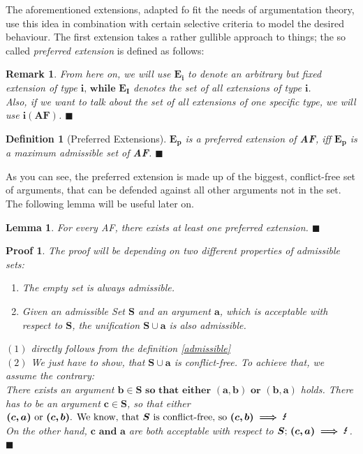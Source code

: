 \documentclass[12pt]{report}
\numberwithin{figure}{chapter}
\theoremstyle{break}
\newtheorem{defn}{Definition}[chapter]
\newtheorem{lem}{Lemma}[chapter]
\newtheorem*{prf}{Proof}
\newtheorem*{rmrk}{Remark}
\newenvironment{mydefn}{\begin{defn}}{$\blacksquare$ \end{defn}}
\newenvironment{mylem}{\begin{lem}}{$\blacksquare$ \end{lem}}
\newenvironment{myprf}{\begin{prf}}{$\blacksquare$ \end{prf}}
\newenvironment{myrmrk}{\begin{rmrk}}{$\blacksquare$ \end{rmrk}}
\begin{document}
The aforementioned extensions, adapted fo fit the needs of argumentation theory, use this idea in combination with certain selective criteria to model the desired behaviour. 
The first extension takes a rather gullible approach to things; the so called \textit{preferred extension} is defined as follows:

\begin{myrmrk}
From here on, we will use $\bm{E_{i}}$ to denote an arbitrary but fixed extension of type $\bm{i \text{, while } E_{I}}$ denotes the set of all extensions of type $\bm{i}$.\\
Also, if we want to talk about the set of all extensions of one specific type, we will use $\bm{i(AF)}$.
\end{myrmrk}

\begin{mydefn}[Preferred Extensions]
$\bm{E_{p}}$ is a preferred extension of \textbf{AF}, iff $\bm{E_{p}}$ is a maximum admissible set of \textbf{AF}.
\end{mydefn}

As you can see, the preferred extension is made up of the biggest, conflict-free set of arguments, that can be defended against all other arguments not in the set.\\
The following lemma will be useful later on.
\begin{mylem}
For every AF, there exists at least one preferred extension.
\end{mylem}

\begin{myprf}
The proof will be depending on two different properties of admissible sets:
\begin{enumerate}
	\item{The empty set is always admissible.}
	\item{Given an admissible Set $\bm{S}$ and an argument $\bm{a}$, which is acceptable with respect to $\bm{S}$, the unification $\bm{S \cup a}$ is also admissible.}
\end{enumerate}
$(1)$ directly follows from the definition \ref{admissible}\\
$(2)$ We just have to show, that $\bm{S \cup a}$ is conflict-free. To achieve that, we assume the contrary:\\ 
There exists an argument $\bm{b \in S \text{ so that either } (a,b) \text{ or } (b,a)}$ holds.
There has to be an argument $\bm{c \in S}$, so that either $\bm{(c,a) \text{ or } (c,b) \text{. We know, that } S \text{ is conflict-free, so } (c,b) \implies \text{\Lightning}}$\\
On the other hand, $\bm{c \text{ and } a}$ are both acceptable with respect to $\bm{S \text{; } (c,a) \implies \text{\Lightning}}$.  
\end{myprf}
\end{document}
